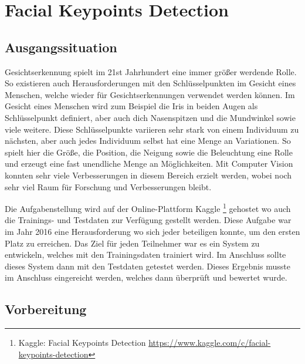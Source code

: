 \chapter{Facial Keypoints Detection}
\label{cha:Facial Keypoints Detection}

\section{Ausgangssituation}

Gesichtserkennung spielt im 21st Jahrhundert eine immer größer werdende Rolle. 
So existieren auch Herausforderungen mit den Schlüsselpunkten im Gesicht eines Menschen, welche wieder für Gesichtserkennungen verwendet werden können. 
Im Gesicht eines Menschen wird zum Beispiel die Iris in beiden Augen als Schlüsselpunkt definiert, aber auch dich Nasenspitzen und die Mundwinkel sowie viele weitere.
Diese Schlüsselpunkte variieren sehr stark von einem Individuum zu nächsten, aber auch jedes Individuum selbst hat eine Menge an Variationen. 
So spielt hier die Größe, die Position, die Neigung sowie die Beleuchtung eine Rolle und erzeugt eine fast unendliche Menge an Möglichkeiten. 
Mit Computer Vision konnten sehr viele Verbesserungen in diesem Bereich erzielt werden, wobei noch sehr viel Raum für Forschung und Verbesserungen bleibt. \newline

\noindent
Die Aufgabenstellung wird auf der Online-Plattform Kaggle \footnote{Kaggle: Facial Keypoints Detection \url{https://www.kaggle.com/c/facial-keypoints-detection}} gehostet wo auch die Trainings- und Testdaten zur Verfügung gestellt werden. 
Diese Aufgabe war im Jahr 2016 eine Herausforderung wo sich jeder beteiligen konnte, um den ersten Platz zu erreichen. 
Das Ziel für jeden Teilnehmer war es ein System zu entwickeln, welches mit den Trainingsdaten trainiert wird.
Im Anschluss sollte dieses System dann mit den Testdaten getestet werden. 
Dieses Ergebnis musste im Anschluss eingereicht werden, welches dann überprüft und bewertet wurde. 

\section{Vorbereitung}

